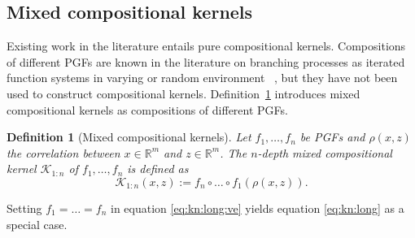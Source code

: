 \documentclass[final, 12pt]{colt2021} %
\newtheorem{dfn}{Definition}
\begin{document}


\subsection{Mixed compositional kernels}
\label{sec:varying_compositional_kernels}


Existing work in the literature entails
pure compositional kernels.
Compositions of different PGFs
are known in the literature on branching processes
as iterated function systems in varying or random environment
~\citep{kozlov1976, kersting2017, alsmeyer2021},
but they have not been used to construct
compositional kernels.
Definition~\ref{def:comp_kernel_in_varying_env}
introduces mixed compositional kernels
as compositions of different PGFs.

\begin{dfn}[Mixed compositional kernels]
	\label{def:comp_kernel_in_varying_env}
	Let $f_1,\ldots,f_n$ be PGFs and
	$\rho (x, z)$ the correlation between $x\in\mathbb{R}^m$ and $z\in\mathbb{R}^m$.
	The $n$-depth mixed compositional kernel $\mathcal{K}_{1:n}$
	of $f_1,\ldots,f_n$
	is defined as
	\begin{equation}
	\label{eq:kn:long:ve}
	\mathcal{K}_{1:n}(x, z) :=
	f_n\circ\dots\circ f_1
	(\rho(x, z)).
	\end{equation}
\end{dfn}

Setting $f_1=\dots=f_n$ in equation \eqref{eq:kn:long:ve}
yields equation \eqref{eq:kn:long} as a special case.
\end{document}
